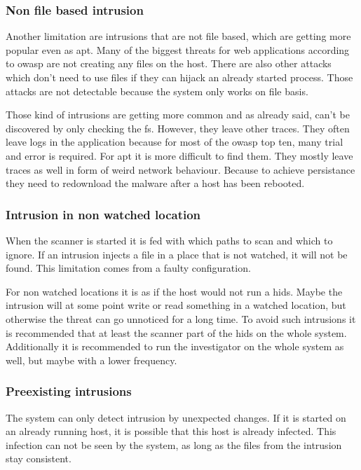 \subsubsection{Non file based intrusion}
\label{sec:limitation:nonFileBased}
Another limitation are intrusions that are not file based, which are getting more popular even as \gls{apt}. Many of the biggest threats for web applications according to \gls{owasp} are not creating any files on the host. \cite{owasp} There are also other attacks which don't need to use files if they can hijack an already started process. Those attacks are not detectable because the system only works on file basis.

Those kind of intrusions are getting more common and as already said, can't be discovered by only checking the \gls{fs}. However, they leave other traces. They often leave logs in the application because for most of the \gls{owasp} top ten, many trial and error is required. For \gls{apt} it is more difficult to find them. They mostly leave traces as well in form of weird network behaviour. Because to achieve persistance they need to redownload the malware after a host has been rebooted.

\subsubsection{Intrusion in non watched location}
\label{sec:limitation:nonWatched}
When the scanner is started it is fed with which paths to scan and which to ignore. If an intrusion injects a file in a place that is not watched, it will not be found. This limitation comes from a faulty configuration.

For non watched locations it is as if the host would not run a \gls{hids}. Maybe the intrusion will at some point write or read something in a watched location, but otherwise the threat can go unnoticed for a long time. To avoid such intrusions it is recommended that at least the scanner part of the \gls{hids} on the whole system. Additionally it is recommended to run the investigator on the whole system as well, but maybe with a lower frequency.

\subsubsection{Preexisting intrusions}
\label{sec:limitation:preexisting}
The system can only detect intrusion by unexpected changes. If it is started on an already running host, it is possible that this host is already infected. This infection can not be seen by the system, as long as the files from the intrusion stay consistent. 

